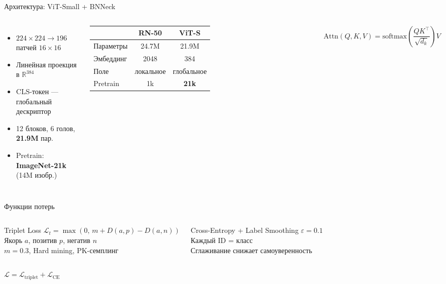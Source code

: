 \documentclass[aspectratio=169,12pt]{beamer}
\begin{document}
\begin{frame}{Архитектура: ViT-Small + BNNeck}
  \begin{columns}[T,onlytextwidth]
    \begin{itemize}\setlength{\itemsep}{7pt}
      \item $224\times224 \to 196$ патчей $16\times16$
      \item Линейная проекция в $\mathbb{R}^{384}$
      \item CLS-токен --- глобальный дескриптор
      \item 12 блоков, 6 голов, \textbf{21.9M} пар.
      \item Pretrain: \textbf{ImageNet-21k} (14M изобр.)
    \end{itemize}
    \renewcommand{\arraystretch}{1.3}
    \begin{tabular}{lcc}
      \toprule
      & \textbf{RN-50} & \textbf{ViT-S} \\
      \midrule
      Параметры & 24.7M & 21.9M \\
      Эмбеддинг & 2048 & 384 \\
      Поле & локальное & глобальное \\
      Pretrain & 1k & \textbf{21k} \\
      \bottomrule
    \end{tabular}
    \vspace{0.5em}
    {\small$\mathrm{Attn}(Q,K,V)=\mathrm{softmax}\!\left(\dfrac{QK^\top}{\sqrt{d_k}}\right)\!V$}
  \end{columns}
\end{frame}

\begin{frame}{Функции потерь}
  \begin{columns}[T,onlytextwidth]
    \begin{block}{Triplet Loss}
      \small
      $\mathcal{L}_t = \max\!\left(0,\, m + D(a,p) - D(a,n)\right)$\\[0.4em]
      Якорь $a$, позитив $p$, негатив $n$\\[0.2em]
      $m=0.3$, Hard mining, PK-семплинг
    \end{block}
    \begin{block}{Cross-Entropy + Label Smoothing}
      \small
      $\varepsilon = 0.1$\\[0.4em]
      Каждый ID = класс\\[0.2em]
      Сглаживание снижает самоуверенность
    \end{block}
  \end{columns}
  \vspace{0.8em}
  \begin{center}
  $\mathcal{L} = \mathcal{L}_{\mathrm{triplet}} + \mathcal{L}_{\mathrm{CE}}$
  \end{center}
\end{frame}
\end{document}
